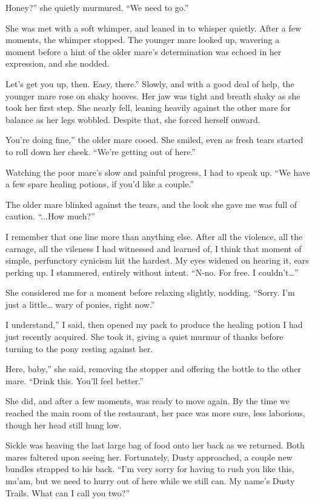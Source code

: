 \leavevmode{}Honey?” she quietly murmured. “We need to go.”

She was met with a soft whimper, and leaned in to whisper quietly. After a few moments, the whimper stopped. The younger mare looked up, wavering a moment before a hint of the older mare’s determination was echoed in her expression, and she nodded.

\leavevmode{}Let’s get you up, then. Easy, there.” Slowly, and with a good deal of help, the younger mare rose on shaky hooves. Her jaw was tight and breath shaky as she took her first step. She nearly fell, leaning heavily against the other mare for balance as her legs wobbled. Despite that, she forced herself onward.

\leavevmode{}You’re doing fine,” the older mare cooed. She smiled, even as fresh tears started to roll down her cheek. “We’re getting out of here.”

Watching the poor mare’s slow and painful progress, I had to speak up. “We have a few spare healing potions, if you’d like a couple.”

The older mare blinked against the tears, and the look she gave me was full of caution. “...How much?”

I remember that one line more than anything else. After all the violence, all the carnage, all the vileness I had witnessed and learned of, I think that moment of simple, perfunctory cynicism hit the hardest. My eyes widened on hearing it, ears perking up. I stammered, entirely without intent. “N-no. For free. I couldn’t…”

She considered me for a moment before relaxing slightly, nodding. “Sorry. I’m just a little… wary of ponies, right now.”

\leavevmode{}I understand,” I said, then opened my pack to produce the healing potion I had just recently acquired. She took it, giving a quiet murmur of thanks before turning to the pony resting against her.

\leavevmode{}Here, baby,” she said, removing the stopper and offering the bottle to the other mare. “Drink this. You’ll feel better.”

She did, and after a few moments, was ready to move again. By the time we reached the main room of the restaurant, her pace was more sure, less laborious, though her head still hung low.

Sickle was heaving the last large bag of food onto her back as we returned. Both mares faltered upon seeing her. Fortunately, Dusty approached, a couple new bundles strapped to his back. “I’m very sorry for having to rush you like this, ma’am, but we need to hurry out of here while we still can. My name’s Dusty Trails. What can I call you two?”

